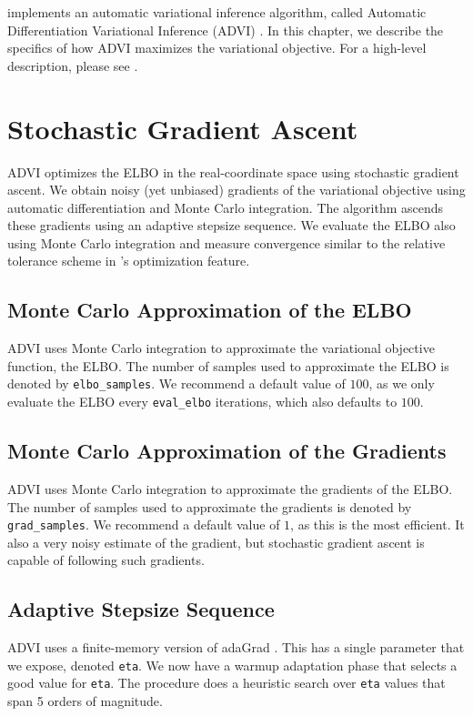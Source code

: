 \noindent
\Stan implements an automatic variational inference algorithm, called
Automatic Differentiation Variational Inference (ADVI)
\citep{Kucukelbir:2015}. In this chapter, we describe the specifics of
how ADVI maximizes the variational objective. For a high-level
description, please see .

\section{Stochastic Gradient Ascent}

ADVI optimizes the ELBO in the real-coordinate space using stochastic
gradient ascent. We obtain noisy (yet unbiased) gradients of the
variational objective using automatic differentiation and Monte Carlo
integration. The algorithm ascends these gradients using an adaptive
stepsize sequence. We evaluate the ELBO also using Monte Carlo
integration and measure convergence similar to the relative tolerance
scheme in \Stan's optimization feature.

\subsection{Monte Carlo Approximation of the ELBO}

ADVI uses Monte Carlo integration to approximate the variational
objective function, the ELBO. The number of samples used to
approximate the ELBO is denoted by \texttt{elbo\_samples}. We
recommend a default value of $100$, as we only evaluate the ELBO every
\texttt{eval\_elbo} iterations, which also defaults to $100$.

\subsection{Monte Carlo Approximation of the Gradients}

ADVI uses Monte Carlo integration to approximate the gradients of the
ELBO. The number of samples used to approximate the gradients is
denoted by \texttt{grad\_samples}. We recommend a default value of
$1$, as this is the most efficient. It also a very noisy estimate of
the gradient, but stochastic gradient ascent is capable of following
such gradients.

\subsection{Adaptive Stepsize Sequence}

ADVI uses a finite-memory version of adaGrad \citep{Duchi:2011}. This
has a single parameter that we expose, denoted \texttt{eta}. We now
have a warmup adaptation phase that selects a good value for
\texttt{eta}. The procedure does a heuristic search over \texttt{eta}
values that span 5 orders of magnitude.

